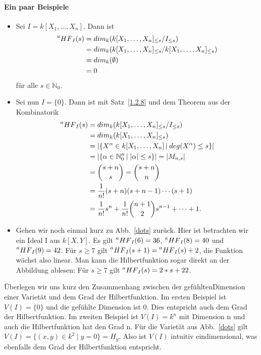 \documentclass{article}
\newcommand*{\R}{k[X_{1},\ldots,X_{n}]}
\begin{document}
	\paragraph{Ein paar Beispiele}
	\begin{itemize}
	\item Sei \(I = \R\). Dann ist
		\begin{align*}
			\prescript{a}{}{HF}_{I}(s) &= dim_{k}(\R_{\leq s}/I_{\leq s}) \\
			&= dim_{k}(\R_{\leq s}/\R_{\leq s}) \\
			&= dim_{k}(\emptyset) \\
			&= 0
		\end{align*}
	 für alle \(s \in \mathbb{N}_{0}\).  
	\item Sei nun \(I = \{0\}\). Dann ist mit Satz~\ref{1.2.8} und dem Theorem aus der Kombinatorik
		\begin{align*}
			\prescript{a}{}{HF}_{I}(s) &= dim_{k}(\R_{\leq s}/I_{\leq s}) \\
			&= dim_{k}(\R_{\leq s}) \\
			&= |\{ X^{\alpha} \in \R\, |\; deg(X^{\alpha}) \leq s\}| \\
			&= |\{ \alpha \in \mathbb{N}^{n}_{0}\, |\; |\alpha| \leq s\}| = |M_{n,s}| \\
			&= \binom{s+n}{s} = \binom{s+n}{n} \\
			&= \frac{1}{n!}(s+n)(s+n-1)\cdots (s+1) \\
			&= \frac{1}{n!}s^{n} + \frac{1}{n!}\binom{n+1}{2}s^{n-1} + \cdots + 1. \\
		\end{align*}
	\item Gehen wir noch einmal kurz zu Abb.~\ref{dots} zurück. Hier ist betrachten wir ein 
	Ideal I aus \(k[X,Y]\). Es gilt \(\prescript{a}{}{HF}_{I}(6) = 36\),
	\(\prescript{a}{}{HF}_{I}(8) = 40\) und \(\prescript{a}{}{HF}_{I}(9) = 42\).
	Für \(s \geq 7\) gilt \(\prescript{a}{}{HF}_{I}(s+1) = \prescript{a}{}{HF}_{I}(s) + 2\),
	die Funktion wächst also linear. Man kann die Hilbertfunktion sogar direkt an der Abbildung
	ablesen: Für \(s \geq 7\) gilt \(\prescript{a}{}{HF}_{I}(s) = 2*s + 22\).
	\end{itemize}

	Überlegen wir uns kurz den Zusammenhang zwischen der \glqq gefühlten\grqq  Dimension einer Varietät und
	dem Grad der Hilbertfunktion. Im ersten Beispiel ist \(V(I) = \{0\}\) und die gefühlte
	Dimension ist 0. Dies entspricht auch dem Grad der Hilbertfunktion. Im zweiten Beispiel ist
	\(V(I) = k^n\) mit Dimension n und auch die Hilbertfunktion hat den Grad n. Für die Varietät 
	aus Abb.~\ref{dots} gilt \(V(I) = \{(x,y) \in k^2\;|\; y = 0\} = H_y\). Also ist \(V(I)\)
	intuitiv eindimensional, was ebenfalls dem Grad der Hilbertfunktion entspricht.
\end{document}
